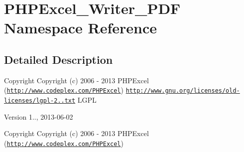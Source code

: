 \hypertarget{namespacePHPExcel__Writer__PDF}{}\section{P\+H\+P\+Excel\+\_\+\+Writer\+\_\+\+P\+DF Namespace Reference}
\label{namespacePHPExcel__Writer__PDF}


\subsection{Detailed Description}
\begin{DoxyCopyright}{Copyright}
Copyright (c) 2006 -\/ 2013 P\+H\+P\+Excel (\href{http://www.codeplex.com/PHPExcel}{\tt http\+://www.\+codeplex.\+com/\+P\+H\+P\+Excel})  \href{http://www.gnu.org/licenses/old-licenses/lgpl-2.1.txt}{\tt http\+://www.\+gnu.\+org/licenses/old-\/licenses/lgpl-\/2..\+txt} L\+G\+PL 
\end{DoxyCopyright}
\begin{DoxyVersion}{Version}
1.., 2013-\/06-\/02
\end{DoxyVersion}
\begin{DoxyCopyright}{Copyright}
Copyright (c) 2006 -\/ 2013 P\+H\+P\+Excel (\href{http://www.codeplex.com/PHPExcel}{\tt http\+://www.\+codeplex.\+com/\+P\+H\+P\+Excel}) 
\end{DoxyCopyright}
